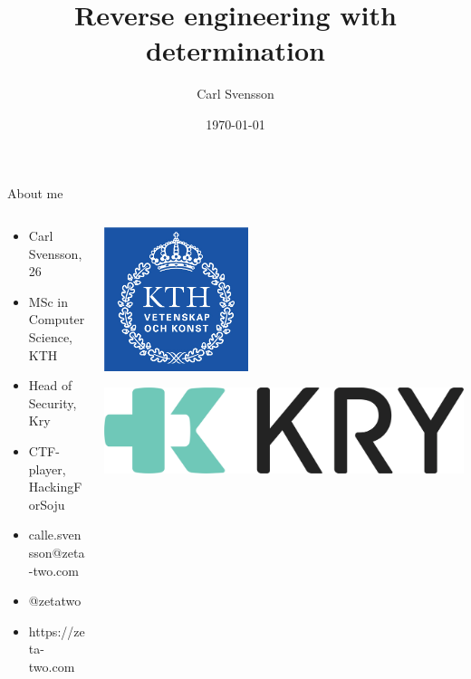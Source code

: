 \documentclass[10pt, compress]{beamer}
\title{Reverse engineering with determination}
\date{\today}
\author{Carl Svensson}
\institute{Securityfest 2017}
\begin{document}
\maketitle

\begin{frame}{About me}
  
	\begin{columns}
		\begin{column}{0.6\textwidth}  
  
  		\begin{itemize}
		  \item Carl Svensson, 26
		  \item MSc in Computer Science, KTH
		  \item Head of Security, Kry
		  \item CTF-player, HackingForSoju
		  \item \faEnvelope \hskip 2mm calle.svensson@zeta-two.com
		  \item \faTwitter \hskip 2mm  @zetatwo
		  \item \faGlobe \hskip 2mm https://zeta-two.com
		\end{itemize}
		
		\end{column}
		\begin{column}{0.4\textwidth} 
			\begin{center}
			\includegraphics[width=0.4\textwidth]{images/kth.jpg}
			\end{center}
			\vspace{1cm}
			\includegraphics[width=\textwidth]{images/kry_logo.png}
		\end{column}
	\end{columns}
  
\end{frame}
\end{document}
